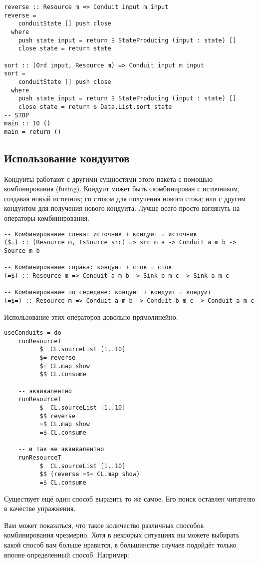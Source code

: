 {\begin{lstlisting}
reverse :: Resource m => Conduit input m input
reverse =
    conduitState [] push close
  where
    push state input = return $ StateProducing (input : state) []
    close state = return state

sort :: (Ord input, Resource m) => Conduit input m input
sort =
    conduitState [] push close
  where
    push state input = return $ StateProducing (input : state) []
    close state = return $ Data.List.sort state
-- STOP
main :: IO ()
main = return ()
\end{lstlisting}

\subsection{Использование кондуитов}
Кондуиты работают с другими сущностями этого пакета с помощью комбинирования (fusing).
Кондуит может быть скомбинирован с источником, создавая новый источник; 
со стоком для получения нового стока; или с другим кондуитом для получения 
нового кондуита. Лучше всего просто взглянуть на операторы комбинирования. 
\begin{lstlisting}
-- Комбинирование слева: источник + кондуит = источник
($=) :: (Resource m, IsSource src) => src m a -> Conduit a m b -> Source m b

-- Комбинирование справа: кондуит + сток = сток
(=$) :: Resource m => Conduit a m b -> Sink b m c -> Sink a m c

-- Комбинирование по середине: кондуит + кондуит = кондуит
(=$=) :: Resource m => Conduit a m b -> Conduit b m c -> Conduit a m c
\end{lstlisting}
Использование этих операторов довольно прямолинейно.
\begin{lstlisting}
useConduits = do
    runResourceT
          $  CL.sourceList [1..10]
          $= reverse
          $= CL.map show
          $$ CL.consume

    -- эквивалентно
    runResourceT
          $  CL.sourceList [1..10]
          $$ reverse
          =$ CL.map show
          =$ CL.consume

    -- и так же эквивалентно
    runResourceT
          $  CL.sourceList [1..10]
          $$ (reverse =$= CL.map show)
          =$ CL.consume
\end{lstlisting}
Существует ещё один способ выразить то же самое. Его поиск оставлен читателю
 в качестве упражнения.

Вам может показаться, что такое количество различных способов комбинирования 
чрезмерно. Хотя в некоорых ситуациях вы можете выбирать какой способ вам больше нравится,
в большинстве случаев подойдёт только вполне определенный способ. Например:

}
